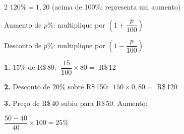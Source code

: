 \documentclass[12pt]{article}
\begin{document}
\begin{multicols}{2}
$120\% = 1{,}20$ \hfill {\small(acima de 100\%: representa um aumento)}


Aumento de $p\%$: multiplique por $\left(1 + \dfrac{p}{100}\right)$

Desconto de $p\%$: multiplique por $\left(1 - \dfrac{p}{100}\right)$




\textbf{1.} $15\%$ de R\$\,80: $\;\dfrac{15}{100} \times 80 = $ R\$\,12

\textbf{2.} Desconto de 20\% sobre R\$\,150: $\;150 \times 0{,}80 = $ R\$\,120

\textbf{3.} Preço de R\$\,40 subiu para R\$\,50. Aumento:

$\dfrac{50-40}{40} \times 100 = 25\%$


\end{multicols}


\end{document}
